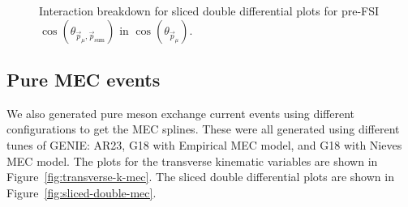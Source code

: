 \documentclass{article}
\newcommand{\vm}{\vec{p}_\mu}
\newcommand{\vtp}{\vec{p}_{\text{sum}}}
\begin{document}
\begin{figure}
    \caption{Interaction breakdown for sliced double differential plots for pre-FSI $\cos(\theta_{\vm,\vtp})$ in $\cos(\theta_{\vec{p}_{\mu}})$.}
    \label{fig:inte-breakdown-double-cos-opening-angle-muon-total-proton-no-fsi}
\end{figure}

\subsection{Pure MEC events}

We also generated pure meson exchange current events using different configurations to get the MEC splines. 
These were all generated using different tunes of GENIE: AR23, G18 with Empirical MEC model, and G18 with Nieves MEC model. 
The plots for the transverse kinematic variables are shown in Figure~\ref{fig:transverse-k-mec}. 
The sliced double differential plots are shown in Figure~\ref{fig:sliced-double-mec}.
\end{document}

